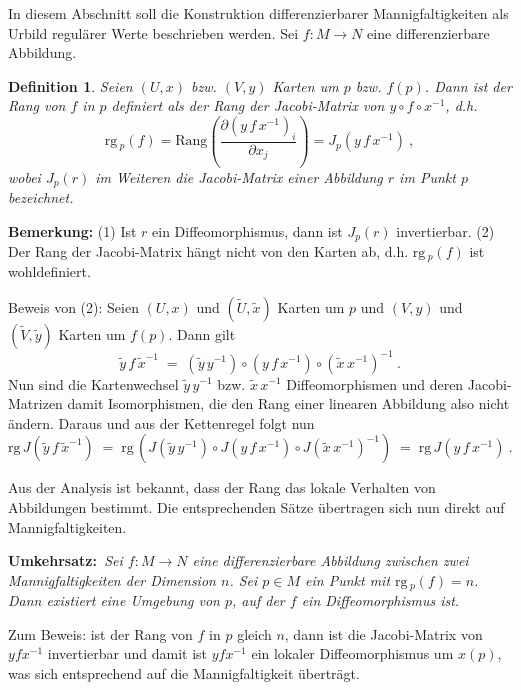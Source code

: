 \documentclass[12pt,a4paper]{article}
\def\rg{\mathrm{rg}\,}
\newtheorem{Definition}[Lemma]{Definition}
\begin{document}
In diesem Abschnitt soll die Konstruktion differenzierbarer Mannigfaltigkeiten als Urbild regul\"arer Werte
beschrieben werden. Sei $f:M\rightarrow N$ eine differenzierbare Abbildung.

\begin{Definition}
Seien $(U,x)$ bzw. $(V,y)$ Karten um $p$ bzw. $f(p)$. Dann ist der {\em Rang} von $f$ in $p$ definiert als
der Rang der Jacobi-Matrix von $y\circ f \circ x^{-1}$, d.h.
$$
\rg_p(f) = \mathrm{Rang} \left( \frac{\partial (y\,f\,x^{-1})_i}{\partial x_j}\right) = J_p(y\,f\,x^{-1})\ ,
$$
wobei $J_p(r)$ im Weiteren die Jacobi-Matrix einer Abbildung $r$ im Punkt $p$ bezeichnet.
\end{Definition}


{\bf Bemerkung:} (1) Ist $r$ ein Diffeomorphismus, dann ist $J_p(r)$ invertierbar. (2) Der Rang der Jacobi-Matrix
h\"angt nicht von den Karten ab, d.h. $\rg_p(f)$ ist wohldefiniert.

\medskip

Beweis von (2): Seien $(U,x)$ und $(\tilde U, \tilde x)$ Karten um $p$ und $(V,y)$ und $(\tilde V, \tilde y)$
Karten um $f(p)$. Dann gilt
$$
\tilde y \, f \, \tilde x^{-1} \;= \; (\tilde y \, y^{-1}) \circ (y\,f\, x^{-1}) \circ (\tilde x \, x^{-1})^{-1} \ .
$$
Nun sind die Kartenwechsel $\tilde y \, y^{-1}$ bzw. $\tilde x \, x^{-1}$ Diffeomorphismen und deren Jacobi-Matrizen
damit Isomorphismen, die den Rang einer linearen Abbildung also nicht \"andern. Daraus und aus der Kettenregel folgt nun
$$
\rg J(\tilde y\,f\,\tilde x^{-1}) \;=\; \rg \left( J(\tilde y \, y^{-1}) \circ J(y\,f\, x^{-1}) \circ J(\tilde x \, x^{-1})^{-1} \right)
\;=\; \rg J(y\,f\,x^{-1})\ .
$$

Aus der Analysis ist bekannt, dass der Rang das lokale Verhalten von Abbildungen bestimmt. Die entsprechenden S\"atze
\"ubertragen sich nun direkt auf Mannigfaltigkeiten.

\medskip

{\bf Umkehrsatz:}{\it  \, Sei $f:M\rightarrow N$ eine differenzierbare Abbildung zwischen zwei Mannigfaltigkeiten der
Dimension $n$. Sei $p\in M$ ein Punkt mit $\rg_p(f)=n$. Dann existiert eine Umgebung von $p$, auf der $f$ ein
Diffeomorphismus ist.}

\medskip

Zum Beweis: ist der Rang von $f$ in $p$ gleich $n$, dann ist die Jacobi-Matrix von $y f x^{-1}$ invertierbar und
damit ist $y f x^{-1}$ ein lokaler Diffeomorphismus um $x(p)$, was sich entsprechend auf die Mannigfaltigkeit
\"ubertr\"agt.
\end{document}
